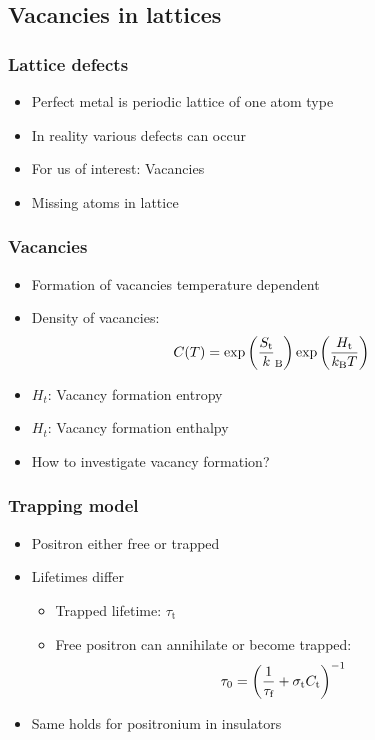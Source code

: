 \documentclass[english, fleqn]{beamer}
\begin{document}
\subsection{Vacancies in lattices}

\begin{frame}
    \frametitle{Lattice defects}
    \begin{itemize}
        \item 
            Perfect metal is periodic lattice of one atom type
        \item
            In reality various defects can occur
        \pause
        \item
            For us of interest: Vacancies
        \pause
        \item
            Missing atoms in lattice
    \end{itemize}
\end{frame}

\begin{frame}
    \frametitle{Vacancies}
    \begin{itemize}
        \item
            Formation of vacancies temperature dependent
        \item
            Density of vacancies:
            \[
                C(T)=\exp\left( \frac{S_\text{t}}k_\mathrm{B} \right)\exp\left( \frac{H_\text{t}}{k_\mathrm{B}T} \right)
            \]
        \item
            $H_t$: Vacancy formation entropy
        \item
            $H_t$: Vacancy formation enthalpy
        \pause
        \item
            How to investigate vacancy formation?
   \end{itemize}
\end{frame}

\begin{frame}
    \frametitle{Trapping model}
    \begin{itemize}
        \item 
            Positron either free or trapped
        \item
            Lifetimes differ
            \begin{itemize}
                \item 
                    Trapped lifetime: $\tau_\text{t}$
                \item 
                    Free positron can annihilate or become trapped: 
                    \[
                        \tau_0 = \left( \frac1{\tau_\text{f}}
                        + \sigma_\text{t}C_\text{t} \right)^{-1}
                    \]
            \end{itemize}
        \item
            Same holds for positronium in insulators
    \end{itemize}
\end{frame}
\end{document}
